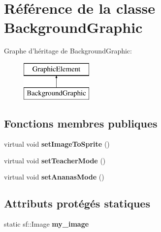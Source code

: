 \hypertarget{class_background_graphic}{\section{Référence de la classe Background\-Graphic}
\label{class_background_graphic}
}
Graphe d'héritage de Background\-Graphic\-:\begin{figure}[H]
\begin{center}
\leavevmode
\includegraphics[height=2.000000cm]{class_background_graphic}
\end{center}
\end{figure}
\subsection*{Fonctions membres publiques}
\begin{DoxyCompactItemize}
\item 
\hypertarget{class_background_graphic_a6942ac3404db018c066dd2db1523c8ad}{virtual void {\bfseries set\-Image\-To\-Sprite} ()}\label{class_background_graphic_a6942ac3404db018c066dd2db1523c8ad}

\item 
\hypertarget{class_background_graphic_a4a0302e431b3abd754e49d151f299198}{virtual void {\bfseries set\-Teacher\-Mode} ()}\label{class_background_graphic_a4a0302e431b3abd754e49d151f299198}

\item 
\hypertarget{class_background_graphic_ac7615a6253c7900692addd2619832f8d}{virtual void {\bfseries set\-Ananas\-Mode} ()}\label{class_background_graphic_ac7615a6253c7900692addd2619832f8d}

\end{DoxyCompactItemize}
\subsection*{Attributs protégés statiques}
\begin{DoxyCompactItemize}
\item 
\hypertarget{class_background_graphic_a4aaecbc474b50bd3ea60b4c8b0541074}{static sf\-::\-Image {\bfseries my\-\_\-image}}\label{class_background_graphic_a4aaecbc474b50bd3ea60b4c8b0541074}

\end{DoxyCompactItemize}
